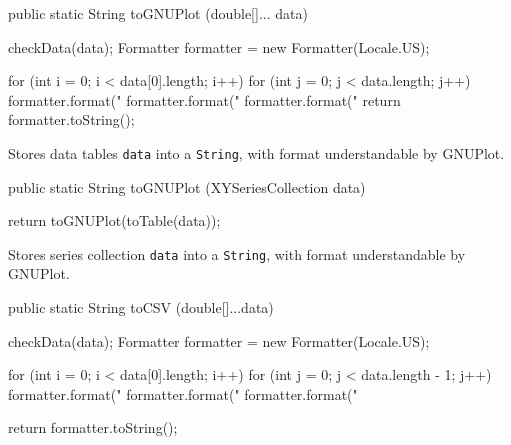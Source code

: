 \begin{code}

   public static String toGNUPlot (double[]... data) \begin{hide} {
      checkData(data);
      Formatter formatter = new Formatter(Locale.US);

      for (int i = 0; i < data[0].length; i++) {
         for (int j = 0; j < data.length; j++) {
            formatter.format("%
         }
         formatter.format("%
      }
      formatter.format("%
      return formatter.toString();
   }\end{hide}
\end{code}
\begin{tabb}
   Stores data tables \texttt{data} into a \texttt{String},
   with format understandable by GNUPlot.
\end{tabb}
\begin{htmlonly}
\end{htmlonly}
\begin{code}

   public static String toGNUPlot (XYSeriesCollection data) \begin{hide} {
      return toGNUPlot(toTable(data));
   }\end{hide}
\end{code}
\begin{tabb}
   Stores series collection \texttt{data} into a \texttt{String},
   with format understandable by GNUPlot.
\end{tabb}
\begin{htmlonly}
\end{htmlonly}
\begin{code}

   public static String toCSV (double[]...data) \begin{hide} {
      checkData(data);
      Formatter formatter = new Formatter(Locale.US);

      for (int i = 0; i < data[0].length; i++) {
         for (int j = 0; j < data.length - 1; j++) {
            formatter.format("%
         }
         formatter.format("%
      }
      formatter.format("%

      return formatter.toString();
   }\end{hide}
\end{code}
